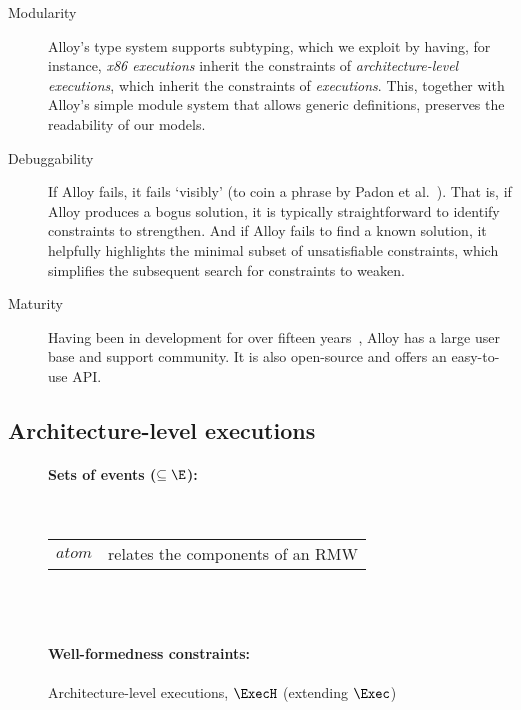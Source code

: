 \begin{description}

\item[Modularity] Alloy's type system supports subtyping, which we
exploit by having, for instance, \emph{x86 executions} inherit the
constraints of \emph{architecture-level executions}, which inherit the
constraints of \emph{executions}. This, together with Alloy's simple
module system that allows generic definitions, preserves the
readability of our models. 

\item[Debuggability] If Alloy fails, it fails `visibly' (to coin a
phrase by Padon et al.~\cite{padon+16}). That is, if Alloy produces a
bogus solution, it is typically straightforward to identify
constraints to strengthen. And if Alloy fails to find a known
solution, it helpfully highlights the minimal subset of unsatisfiable
constraints, which simplifies the subsequent search for constraints to
weaken.

\item[Maturity] Having been in development for over fifteen
years~\cite{jackson+01}, Alloy has a large user base and support
community. It is also open-source and offers an easy-to-use API. 
%
\end{description}

\subsection{Architecture-level executions}

\begin{figure}[t]
\paragraph{Sets of events ($\subseteq \E$):} ~\\
\quad\begin{tabular}{ll}
$atom$ & relates the components of an RMW
\end{tabular} \\~

\paragraph{Well-formedness constraints:}
\caption{Architecture-level executions, $\ExecH$ (extending $\Exec$)}
\label{fig:hw_exec}
\end{figure}

